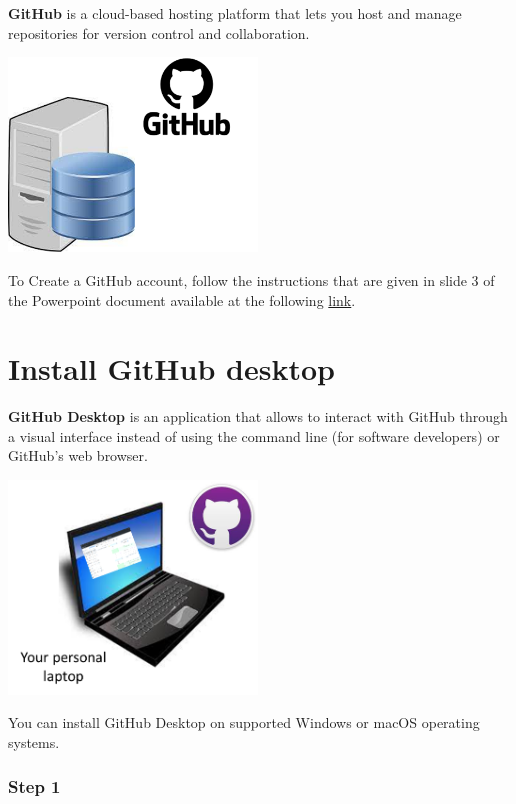 \documentclass[
  letterpaper,
  DIV=11,
  numbers=noendperiod,
  oneside]{scrreprt}
\begin{document}
\textbf{GitHub} is a cloud-based hosting platform that lets you host and
manage repositories for version control and collaboration.

\includegraphics[width=2.60417in,height=\textheight]{./images/paste-15A58C67.png}

To Create a GitHub account, follow the instructions that are given in
slide 3 of the Powerpoint document available at the following
\href{https://drive.switch.ch/index.php/s/1eFnksrX0UtjfZV}{link}.

\hypertarget{sec-GitHub-Desktop-installation}{%
\section{Install GitHub desktop}\label{sec-GitHub-Desktop-installation}}

\textbf{GitHub Desktop} is an application that allows to interact with
GitHub through a visual interface instead of using the command line (for
software developers) or GitHub's web browser.

\includegraphics[width=2.60417in,height=\textheight]{./images/paste-9238B1AB.png}

You can install GitHub Desktop on supported Windows or macOS operating
systems.

\hypertarget{step-1-5}{%
\subsubsection{Step 1}\label{step-1-5}}
\end{document}
